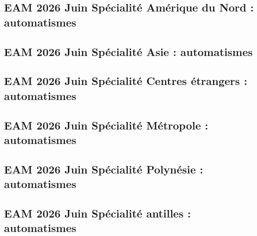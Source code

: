 \documentclass[lang=fr,edition=teacher,layout=sheet]{mxbook}
\begin{document}
\par\bigskip
{}\subsection*{EAM 2026 Juin Spécialité Amérique du Nord : automatismes}
\begingroup\endgroup
\par\bigskip
{}\subsection*{EAM 2026 Juin Spécialité Asie : automatismes}
\begingroup\endgroup
\par\bigskip
{}\subsection*{EAM 2026 Juin Spécialité Centres étrangers : automatismes}
\begingroup\endgroup
\par\bigskip
{}\subsection*{EAM 2026 Juin Spécialité Métropole : automatismes}
\begingroup\endgroup
\par\bigskip
{}\subsection*{EAM 2026 Juin Spécialité Polynésie : automatismes}
\begingroup\endgroup
\par\bigskip
{}\subsection*{EAM 2026 Juin Spécialité antilles : automatismes}
\begingroup\endgroup
\end{document}
